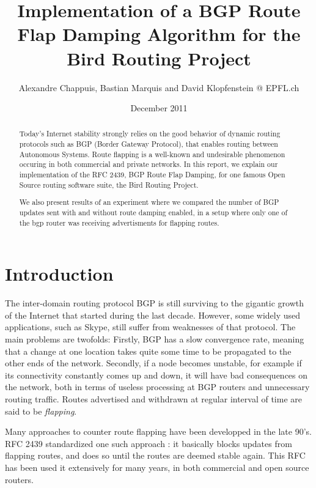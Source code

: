 \documentclass[a4paper,english]{IEEEtran}
\begin{document}
\date{December 2011}

\author{Alexandre Chappuis, Bastian Marquis and David Klopfenstein @ EPFL.ch}

\title{Implementation of a BGP Route Flap Damping Algorithm for the Bird
Routing Project}

\maketitle

\begin{abstract}
Today's Internet stability strongly relies on the good behavior of
dynamic routing protocols such as BGP (Border Gateway Protocol), that
enables routing between Autonomous Systems. Route flapping is a well-known
and undesirable phenomenon occuring in both commercial and private
networks. In this report, we explain our implementation of the RFC
2439, BGP Route Flap Damping, for one famous Open Source routing software
suite, the Bird Routing Project.

We also present results of an experiment where we compared the number
of BGP updates sent with and without route damping enabled, in a setup
where only one of the bgp router was receiving advertisments for flapping
routes. 
\end{abstract}

\section{Introduction}

The inter-domain routing protocol BGP is still surviving to the gigantic
growth of the Internet that started during the last decade. However,
some widely used applications, such as Skype, still suffer from weaknesses
of that protocol. The main problems are twofolds: Firstly, BGP has
a slow convergence rate, meaning that a change at one location takes
quite some time to be propagated to the other ends of the network.
Secondly, if a node becomes unstable, for example if its connectivity
constantly comes up and down, it will have bad consequences on the
network, both in terms of useless processing at BGP routers and unnecessary
routing traffic. Routes advertised and withdrawn at regular interval
of time are said to be \textit{flapping}.

Many approaches to counter route flapping have been developped in
the late 90's. RFC 2439\cite{rfc2439} standardized one such approach
: it basically blocks updates from flapping routes, and does so until
the routes are deemed stable again. This RFC has been used it extensively
for many years, in both commercial and open source routers.
\end{document}
